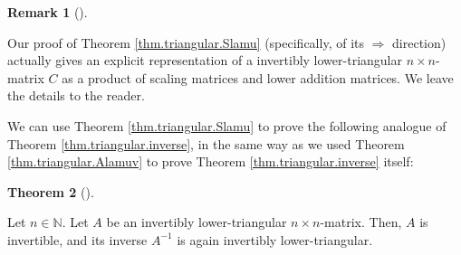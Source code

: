 \documentclass[numbers=enddot,12pt,final,onecolumn,notitlepage]{scrartcl}%
\theoremstyle{definition}
\newtheorem{theo}{Theorem}[section]
\newenvironment{theorem}[1][]
{\begin{theo}[#1]\begin{leftbar}}
{\end{leftbar}\end{theo}}
\newtheorem{remk}[theo]{Remark}
\newenvironment{remark}[1][]
{\begin{remk}[#1]\begin{leftbar}}
{\end{leftbar}\end{remk}}
\begin{document}
\begin{remark}
Our proof of Theorem \ref{thm.triangular.Slamu} (specifically, of its
$\Longrightarrow$ direction) actually gives an explicit representation of a
invertibly lower-triangular $n\times n$-matrix $C$ as a product of scaling
matrices and lower addition matrices. We leave the details to the reader.
\end{remark}

We can use Theorem \ref{thm.triangular.Slamu} to prove the following analogue
of Theorem \ref{thm.triangular.inverse}, in the same way as we used Theorem
\ref{thm.triangular.Alamuv} to prove Theorem \ref{thm.triangular.inverse} itself:

\begin{theorem}
\label{thm.triangular.inverse.inv}Let $n\in\mathbb{N}$. Let $A$ be an
invertibly lower-triangular $n\times n$-matrix. Then, $A$ is invertible, and
its inverse $A^{-1}$ is again invertibly lower-triangular.
\end{theorem}
\end{document}
